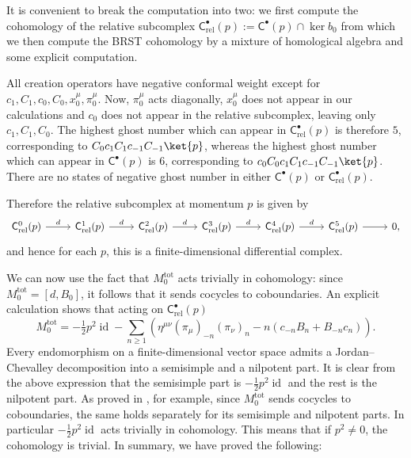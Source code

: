 \documentclass[11pt,reqno,a4paper,final]{amsart}
\theoremstyle{plain}
\theoremstyle{definition}
\newcommand{\sC}{\mathsf{C}}
\newcommand{\Crel}{\mathsf{C}_{\mathrm{rel}}} %
\newcommand{\Mtot}{M^{\text{tot}}}
\newcommand{\vac}{\ket{p}}
\newcommand{\id}{\operatorname{id}}
\newcommand{\1}{\mathbb{1}}
\numberwithin{equation}{section}
\begin{document}
It is convenient to break the computation into two: we first compute
the cohomology of the relative subcomplex $\Crel^\bullet(p) :=
\sC^\bullet(p) \cap \ker b_0$ from which we then compute the BRST
cohomology by a mixture of homological algebra and some explicit
computation.

All creation operators have negative conformal weight except for $c_1,
C_1, c_0, C_0, x^\mu_0, \pi^\mu_0$.  Now, $\pi^\mu_0$ acts diagonally,
$x^\mu_0$ does not appear in our calculations and $c_0$ does not
appear in the relative subcomplex, leaving only $c_1, C_1, C_0$.  The
highest ghost number which can appear in $\Crel^\bullet(p)$ is
therefore $5$, corresponding to $C_0 c_1 C_1 c_{-1} C_{-1}\vac$,
whereas the highest ghost number which can appear in $\sC^\bullet(p)$
is $6$, corresponding to $c_0C_0 c_1 C_1 c_{-1} C_{-1}\vac$.  There
are no states of negative ghost number in either $\sC^\bullet(p)$ or
$\Crel^\bullet(p)$.

Therefore the relative subcomplex at momentum $p$ is given by
\begin{equation}
  \label{eq:Crel}
  \begin{tikzcd}
    \Crel^0(p) \arrow[r,"d"] & \Crel^1(p) \arrow[r,"d"] &  \Crel^2(p)
    \arrow[r,"d"] &  \Crel^3(p) \arrow[r,"d"] &  \Crel^4(p) \arrow[r,"d"] &
    \Crel^5(p) \arrow[r] & 0,
  \end{tikzcd}
\end{equation}
and hence for each $p$, this is a finite-dimensional differential
complex.

We can now use the fact that $\Mtot_0$ acts trivially in cohomology:
since $\Mtot_0 = [d,B_0]$, it follows that it sends cocycles to
coboundaries.  An explicit calculation shows that acting on $\Crel^\bullet(p)$
\begin{equation}
  \Mtot_0 = -\tfrac12 p^2 \id - \sum_{n\geq 1} \left( \eta^{\mu\nu}
    (\pi_\mu)_{-n} (\pi_\nu)_n - n \left( c_{-n} B_n + B_{-n} c_n \right)\right).
\end{equation}
Every endomorphism on a finite-dimensional vector space admits a
Jordan--Chevalley decomposition into a semisimple and a nilpotent
part.  It is clear from the above expression that the semisimple part
is $-\frac12 p^2 \id$ and the rest is the nilpotent part.  As proved
in \cite[§4.2]{MR323842}, for example, since $\Mtot_0$ sends
cocycles to coboundaries, the same holds separately for its semisimple
and nilpotent parts.  In particular $-\frac12 p^2 \id$ acts trivially
in cohomology.  This means that if $p^2 \neq 0$, the cohomology is
trivial.  In summary, we have proved the following:
\end{document}
